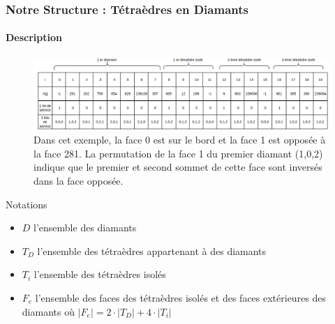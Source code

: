 \documentclass[9pt]{beamer}
\begin{document}
\begin{frame}
\small
\frametitle{Notre Structure : Tétraèdres en Diamants}
\framesubtitle{Description}

\begin{figure}[H]
\begin{center}
\includegraphics[scale=0.275]{Images/structure}
\caption{Dans cet exemple, la face 0 est sur le bord et la face 1 est opposée à la face 281. La permutation de la face 1 du premier diamant (1,0,2) indique que le premier et second sommet de cette face sont inversés dans la face opposée.}
\label{fig:structure}
\end{center}
\end{figure}


\begin{block}{Notations}
\begin{itemize}
\item $D$ l'ensemble des diamants
\item $T_D$ l'ensemble des tétraèdres appartenant à des diamants
\item $T_i$ l'ensemble des tétraèdres isolés
\item $F_e$ l'ensemble des faces des tétraèdres isolés et des faces extérieures des diamants où $|F_e|=2\cdot |T_D|+4\cdot |T_i|$\\
\end{itemize}
\end{block}


\end{frame}

%
\end{document}
